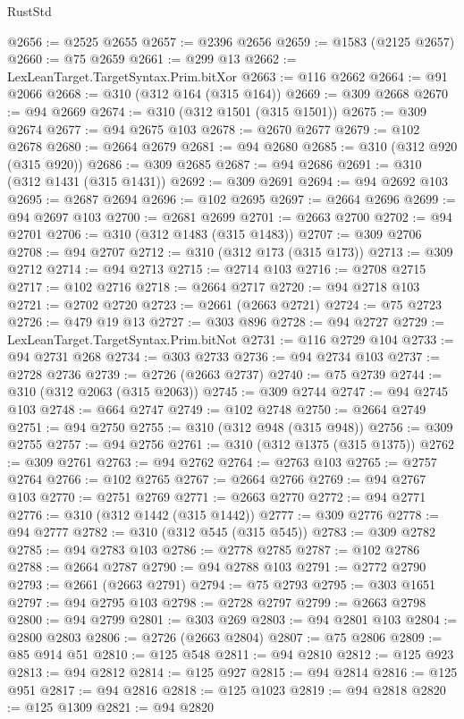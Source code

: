 \begin{lexlean}{RustStd}
\begin{coremodule}
{\begin{coremodule}
{{{{{{{{{{{{{{{{{{{{{{{{{{{{{{{{{{{{{@2656 := @2525 @2655
@2657 := @2396 @2656
@2659 := @1583 (@2125 @2657)
@2660 := @75 @2659
@2661 := @299 @13
@2662 := LexLeanTarget.TargetSyntax.Prim.bitXor
@2663 := @116 @2662
@2664 := @91 @2066
@2668 := @310 (@312 @164 (@315 @164))
@2669 := @309 @2668
@2670 := @94 @2669
@2674 := @310 (@312 @1501 (@315 @1501))
@2675 := @309 @2674
@2677 := @94 @2675 @103
@2678 := @2670 @2677
@2679 := @102 @2678
@2680 := @2664 @2679
@2681 := @94 @2680
@2685 := @310 (@312 @920 (@315 @920))
@2686 := @309 @2685
@2687 := @94 @2686
@2691 := @310 (@312 @1431 (@315 @1431))
@2692 := @309 @2691
@2694 := @94 @2692 @103
@2695 := @2687 @2694
@2696 := @102 @2695
@2697 := @2664 @2696
@2699 := @94 @2697 @103
@2700 := @2681 @2699
@2701 := @2663 @2700
@2702 := @94 @2701
@2706 := @310 (@312 @1483 (@315 @1483))
@2707 := @309 @2706
@2708 := @94 @2707
@2712 := @310 (@312 @173 (@315 @173))
@2713 := @309 @2712
@2714 := @94 @2713
@2715 := @2714 @103
@2716 := @2708 @2715
@2717 := @102 @2716
@2718 := @2664 @2717
@2720 := @94 @2718 @103
@2721 := @2702 @2720
@2723 := @2661 (@2663 @2721)
@2724 := @75 @2723
@2726 := @479 @19 @13
@2727 := @303 @896
@2728 := @94 @2727
@2729 := LexLeanTarget.TargetSyntax.Prim.bitNot
@2731 := @116 @2729 @104
@2733 := @94 @2731 @268
@2734 := @303 @2733
@2736 := @94 @2734 @103
@2737 := @2728 @2736
@2739 := @2726 (@2663 @2737)
@2740 := @75 @2739
@2744 := @310 (@312 @2063 (@315 @2063))
@2745 := @309 @2744
@2747 := @94 @2745 @103
@2748 := @664 @2747
@2749 := @102 @2748
@2750 := @2664 @2749
@2751 := @94 @2750
@2755 := @310 (@312 @948 (@315 @948))
@2756 := @309 @2755
@2757 := @94 @2756
@2761 := @310 (@312 @1375 (@315 @1375))
@2762 := @309 @2761
@2763 := @94 @2762
@2764 := @2763 @103
@2765 := @2757 @2764
@2766 := @102 @2765
@2767 := @2664 @2766
@2769 := @94 @2767 @103
@2770 := @2751 @2769
@2771 := @2663 @2770
@2772 := @94 @2771
@2776 := @310 (@312 @1442 (@315 @1442))
@2777 := @309 @2776
@2778 := @94 @2777
@2782 := @310 (@312 @545 (@315 @545))
@2783 := @309 @2782
@2785 := @94 @2783 @103
@2786 := @2778 @2785
@2787 := @102 @2786
@2788 := @2664 @2787
@2790 := @94 @2788 @103
@2791 := @2772 @2790
@2793 := @2661 (@2663 @2791)
@2794 := @75 @2793
@2795 := @303 @1651
@2797 := @94 @2795 @103
@2798 := @2728 @2797
@2799 := @2663 @2798
@2800 := @94 @2799
@2801 := @303 @269
@2803 := @94 @2801 @103
@2804 := @2800 @2803
@2806 := @2726 (@2663 @2804)
@2807 := @75 @2806
@2809 := @85 @914 @51
@2810 := @125 @548
@2811 := @94 @2810
@2812 := @125 @923
@2813 := @94 @2812
@2814 := @125 @927
@2815 := @94 @2814
@2816 := @125 @951
@2817 := @94 @2816
@2818 := @125 @1023
@2819 := @94 @2818
@2820 := @125 @1309
@2821 := @94 @2820
}}}}}}}}}}}}}}}}}}}}}}}}}}}}}}}}}}}}}
\end{coremodule}}
\end{coremodule}
\end{lexlean}
